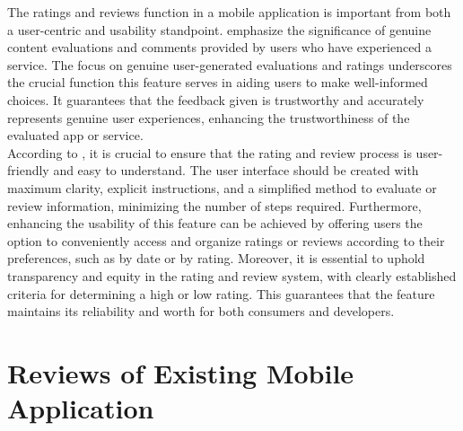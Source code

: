 The ratings and reviews function in a mobile application is important from both a user-centric and usability standpoint. \textcite{abdulrahman22} emphasize the significance of genuine content evaluations and comments provided by users who have experienced a service. The focus on genuine user-generated evaluations and ratings underscores the crucial function this feature serves in aiding users to make well-informed choices. It guarantees that the feedback given is trustworthy and accurately represents genuine user experiences, enhancing the trustworthiness of the evaluated app or service. \\

According to \textcite{weichbroth20}, it is crucial to ensure that the rating and review process is user-friendly and easy to understand. The user interface should be created with maximum clarity, explicit instructions, and a simplified method to evaluate or review information, minimizing the number of steps required. Furthermore, enhancing the usability of this feature can be achieved by offering users the option to conveniently access and organize ratings or reviews according to their preferences, such as by date or by rating. Moreover, it is essential to uphold transparency and equity in the rating and review system, with clearly established criteria for determining a high or low rating. This guarantees that the feature maintains its reliability and worth for both consumers and developers. \pagebreak

\section{Reviews of Existing Mobile Application}
